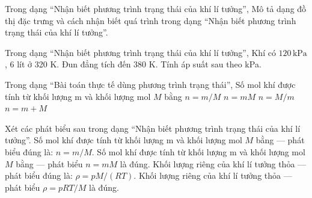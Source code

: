 \begin{ex}
Trong dạng “Nhận biết phương trình trạng thái của khí lí tưởng”, Mô tả dạng đồ thị đặc trưng và cách nhận biết quá trình trong dạng “Nhận biết phương trình trạng thái của khí lí tưởng”.
\choiceTF

\end{ex}

\begin{ex}
Trong dạng “Nhận biết phương trình trạng thái của khí lí tưởng”, Khí có $120\,\text{kPa}$, 6 lít ở 320 K. Đun đẳng tích đến 380 K. Tính áp suất sau theo kPa.
\end{ex}

\begin{ex}
Trong dạng “Bài toán thực tế dùng phương trình trạng thái”, Số mol khí được tính từ khối lượng m và khối lượng mol $M$ bằng
\choice
{\True $n=m/M$}
{$n=mM$}
{$n=M/m$}
{$n=m+M$}
\end{ex}

\begin{ex}
Xét các phát biểu sau trong dạng “Nhận biết phương trình trạng thái của khí lí tưởng”.
\choiceTF
{\True Số mol khí được tính từ khối lượng m và khối lượng mol $M$ bằng — phát biểu đúng là: $n=m/M$.}
{Số mol khí được tính từ khối lượng m và khối lượng mol $M$ bằng — phát biểu $n=mM$ là đúng.}
{\True Khối lượng riêng của khí lí tưởng thỏa — phát biểu đúng là: $\rho=pM/(RT)$.}
{Khối lượng riêng của khí lí tưởng thỏa — phát biểu $\rho=pRT/M$ là đúng.}
\end{ex}

